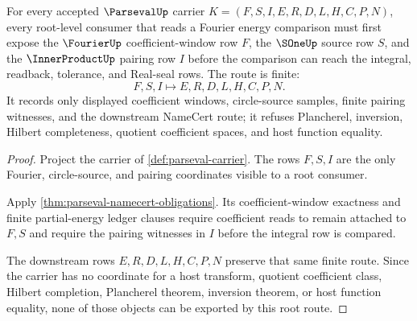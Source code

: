 \begin{theorem}
\label{thm:parseval-root-fourier-innerproduct-route}
For every accepted $\ParsevalUp$ carrier $K=(F,S,I,E,R,D,L,H,C,P,N)$, every root-level consumer that reads a Fourier energy comparison must first expose the $\FourierUp$ coefficient-window row $F$, the $\SOneUp$ source row $S$, and the $\InnerProductUp$ pairing row $I$ before the comparison can reach the integral, readback, tolerance, and Real-seal rows. The route is finite:
$$
F,S,I \longmapsto E,R,D,L,H,C,P,N .
$$
It records only displayed coefficient windows, circle-source samples, finite pairing witnesses, and the downstream NameCert route; it refuses Plancherel, inversion, Hilbert completeness, quotient coefficient spaces, and host function equality.
\end{theorem}
\begin{proof}
Project the carrier of \autoref{def:parseval-carrier}. The rows $F,S,I$ are the only Fourier, circle-source, and pairing coordinates visible to a root consumer.

Apply \autoref{thm:parseval-namecert-obligations}. Its coefficient-window exactness and finite partial-energy ledger clauses require coefficient reads to remain attached to $F,S$ and require the pairing witnesses in $I$ before the integral row is compared.

The downstream rows $E,R,D,L,H,C,P,N$ preserve that same finite route. Since the carrier has no coordinate for a host transform, quotient coefficient class, Hilbert completion, Plancherel theorem, inversion theorem, or host function equality, none of those objects can be exported by this root route.
\end{proof}

